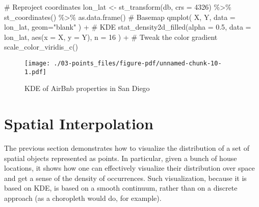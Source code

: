 \documentclass[
  letterpaper,
  krantz2]{style/krantz}
\newenvironment{Shaded}{\begin{snugshade}}{\end{snugshade}}
\newcommand{\AttributeTok}[1]{\textcolor[rgb]{0.40,0.45,0.13}{#1}}
\newcommand{\CommentTok}[1]{\textcolor[rgb]{0.37,0.37,0.37}{#1}}
\newcommand{\DecValTok}[1]{\textcolor[rgb]{0.68,0.00,0.00}{#1}}
\newcommand{\FloatTok}[1]{\textcolor[rgb]{0.68,0.00,0.00}{#1}}
\newcommand{\FunctionTok}[1]{\textcolor[rgb]{0.28,0.35,0.67}{#1}}
\newcommand{\NormalTok}[1]{\textcolor[rgb]{0.00,0.23,0.31}{#1}}
\newcommand{\OtherTok}[1]{\textcolor[rgb]{0.00,0.23,0.31}{#1}}
\newcommand{\SpecialCharTok}[1]{\textcolor[rgb]{0.37,0.37,0.37}{#1}}
\newcommand{\StringTok}[1]{\textcolor[rgb]{0.13,0.47,0.30}{#1}}
\begin{document}
\begin{Shaded}
\begin{Highlighting}[]
\CommentTok{\# Reproject coordinates}
\NormalTok{lon\_lat }\OtherTok{\textless{}{-}} \FunctionTok{st\_transform}\NormalTok{(db, }\AttributeTok{crs =} \DecValTok{4326}\NormalTok{) }\SpecialCharTok{\%\textgreater{}\%}
  \FunctionTok{st\_coordinates}\NormalTok{() }\SpecialCharTok{\%\textgreater{}\%}
  \FunctionTok{as.data.frame}\NormalTok{()}
\CommentTok{\# Basemap}
\FunctionTok{qmplot}\NormalTok{(}
\NormalTok{  X, }
\NormalTok{  Y, }
  \AttributeTok{data =}\NormalTok{ lon\_lat, }
  \AttributeTok{geom=}\StringTok{"blank"}
\NormalTok{) }\SpecialCharTok{+}
  \CommentTok{\# KDE}
  \FunctionTok{stat\_density2d\_filled}\NormalTok{(}\AttributeTok{alpha =} \FloatTok{0.5}\NormalTok{,}
    \AttributeTok{data =}\NormalTok{ lon\_lat, }
    \FunctionTok{aes}\NormalTok{(}\AttributeTok{x =}\NormalTok{ X, }\AttributeTok{y =}\NormalTok{ Y),}
    \AttributeTok{n =} \DecValTok{16}
\NormalTok{  ) }\SpecialCharTok{+}
  \CommentTok{\# Tweak the color gradient}
  \FunctionTok{scale\_color\_viridis\_c}\NormalTok{()}
\end{Highlighting}
\end{Shaded}

\begin{figure}[H]

{\centering \texttt{[image: ./03-points\_files/figure-pdf/unnamed-chunk-10-1.pdf]}

}

\caption{KDE of AirBnb properties in San Diego}

\end{figure}

\hypertarget{spatial-interpolation}{%
\section{Spatial Interpolation}\label{spatial-interpolation}}

The previous section demonstrates how to visualize the distribution of a
set of spatial objects represented as points. In particular, given a
bunch of house locations, it shows how one can effectively visualize
their distribution over space and get a sense of the density of
occurrences. Such visualization, because it is based on KDE, is based on
a smooth continuum, rather than on a discrete approach (as a choropleth
would do, for example).
\end{document}
